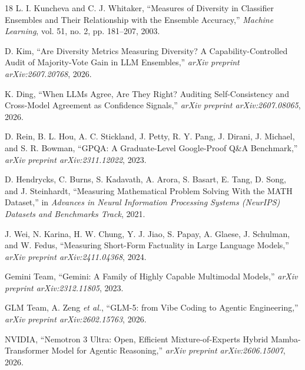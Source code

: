 \documentclass[conference]{IEEEtran}
\begin{document}
\begin{thebibliography}{18}
L. I. Kuncheva and C. J. Whitaker, ``Measures of Diversity in Classifier Ensembles and Their Relationship with the Ensemble Accuracy,'' \emph{Machine Learning}, vol. 51, no. 2, pp. 181--207, 2003.

D. Kim, ``Are Diversity Metrics Measuring Diversity? A Capability-Controlled Audit of Majority-Vote Gain in LLM Ensembles,'' \emph{arXiv preprint arXiv:2607.20768}, 2026.

K. Ding, ``When LLMs Agree, Are They Right? Auditing Self-Consistency and Cross-Model Agreement as Confidence Signals,'' \emph{arXiv preprint arXiv:2607.08065}, 2026.

D. Rein, B. L. Hou, A. C. Stickland, J. Petty, R. Y. Pang, J. Dirani, J. Michael, and S. R. Bowman, ``GPQA: A Graduate-Level Google-Proof Q\&A Benchmark,'' \emph{arXiv preprint arXiv:2311.12022}, 2023.

D. Hendrycks, C. Burns, S. Kadavath, A. Arora, S. Basart, E. Tang, D. Song, and J. Steinhardt, ``Measuring Mathematical Problem Solving With the MATH Dataset,'' in \emph{Advances in Neural Information Processing Systems (NeurIPS) Datasets and Benchmarks Track}, 2021.

J. Wei, N. Karina, H. W. Chung, Y. J. Jiao, S. Papay, A. Glaese, J. Schulman, and W. Fedus, ``Measuring Short-Form Factuality in Large Language Models,'' \emph{arXiv preprint arXiv:2411.04368}, 2024.

Gemini Team, ``Gemini: A Family of Highly Capable Multimodal Models,'' \emph{arXiv preprint arXiv:2312.11805}, 2023.

GLM Team, A. Zeng \emph{et al.}, ``GLM-5: from Vibe Coding to Agentic Engineering,'' \emph{arXiv preprint arXiv:2602.15763}, 2026.

NVIDIA, ``Nemotron 3 Ultra: Open, Efficient Mixture-of-Experts Hybrid Mamba-Transformer Model for Agentic Reasoning,'' \emph{arXiv preprint arXiv:2606.15007}, 2026.

\end{thebibliography}
\end{document}
